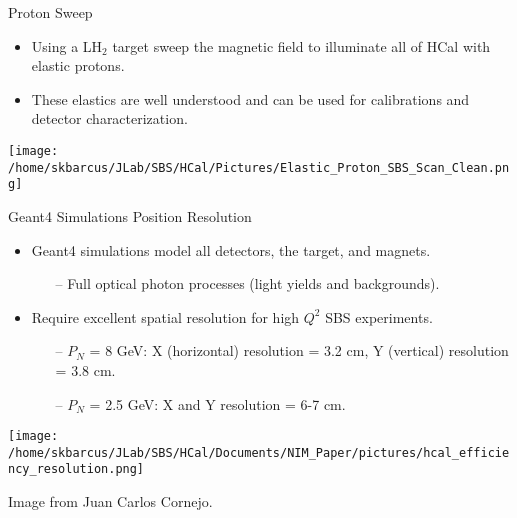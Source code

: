 \documentclass[10pt]{beamer}
\begin{document}
\begin{frame}{Proton Sweep}

	\begin{itemize}
		\item Using a LH$_2$ target sweep the magnetic field to illuminate all of HCal with elastic protons.
		\item These elastics are well understood and can be used for calibrations and detector characterization.
	\end{itemize}
	
	\texttt{[image: /home/skbarcus/JLab/SBS/HCal/Pictures/Elastic\_Proton\_SBS\_Scan\_Clean.png]}

\end{frame}

\begin{frame}{Geant4 Simulations Position Resolution}
	
	\vspace{-2mm}
	\begin{itemize}
		\item Geant4 simulations model all detectors, the target, and magnets.
			\begin{itemize}
				\item[--] Full optical photon processes (light yields and backgrounds).
			\end{itemize}
		\item Require excellent spatial resolution for high $Q^2$ SBS experiments. 
			\begin{itemize}
				\item[--] \alert{$P_N$ = 8 GeV: X (horizontal) resolution = 3.2 cm, Y (vertical) resolution = 3.8 cm.}
				\item[--] \alert{$P_N$ = 2.5 GeV: X and Y resolution = 6-7 cm.}
			\end{itemize}
	\end{itemize}
	
	\vspace{-2mm}
	\begin{center}
  		\texttt{[image: /home/skbarcus/JLab/SBS/HCal/Documents/NIM\_Paper/pictures/hcal\_efficiency\_resolution.png]}
  	\end{center}
  	\vspace{-5mm}
	\tiny{Image from Juan Carlos Cornejo.}
	
\end{frame}
\end{document}
